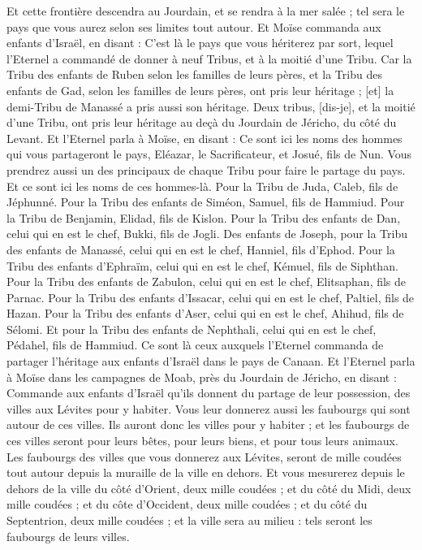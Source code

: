 \begin{multicols}{2}
Et cette frontière descendra au Jourdain, et se rendra à la mer salée ; tel sera le pays que vous aurez selon ses limites tout autour.
Et Moïse commanda aux enfants d'Israël, en disant : C'est là le pays que vous hériterez par sort, lequel l'Eternel a commandé de donner à neuf Tribus, et à la moitié d'une Tribu.
Car la Tribu des enfants de Ruben selon les familles de leurs pères, et la Tribu des enfants de Gad, selon les familles de leurs pères, ont pris leur héritage ; [et] la demi-Tribu de Manassé a pris aussi son héritage.
Deux tribus, [dis-je], et la moitié d'une Tribu, ont pris leur héritage au deçà du Jourdain de Jéricho, du côté du Levant.
Et l'Eternel parla à Moïse, en disant :
Ce sont ici les noms des hommes qui vous partageront le pays, Eléazar, le Sacrificateur, et Josué, fils de Nun.
Vous prendrez aussi un des principaux de chaque Tribu pour faire le partage du pays.
Et ce sont ici les noms de ces hommes-là. Pour la Tribu de Juda, Caleb, fils de Jéphunné.
Pour la Tribu des enfants de Siméon, Samuel, fils de Hammiud.
Pour la Tribu de Benjamin, Elidad, fils de Kislon.
Pour la Tribu des enfants de Dan, celui qui en est le chef, Bukki, fils de Jogli.
Des enfants de Joseph, pour la Tribu des enfants de Manassé, celui qui en est le chef, Hanniel, fils d'Ephod.
Pour la Tribu des enfants d'Ephraïm, celui qui en est le chef, Kémuel, fils de Siphthan.
Pour la Tribu des enfants de Zabulon, celui qui en est le chef, Elitsaphan, fils de Parnac.
Pour la Tribu des enfants d'Issacar, celui qui en est le chef, Paltiel, fils de Hazan.
Pour la Tribu des enfants d'Aser, celui qui en est le chef, Ahihud, fils de Sélomi.
Et pour la Tribu des enfants de Nephthali, celui qui en est le chef, Pédahel, fils de Hammiud.
Ce sont là ceux auxquels l'Eternel commanda de partager l'héritage aux enfants d'Israël dans le pays de Canaan.
\VerseOne{}Et l'Eternel parla à Moïse dans les campagnes de Moab, près du Jourdain de Jéricho, en disant :
Commande aux enfants d'Israël qu'ils donnent du partage de leur possession, des villes aux Lévites pour y habiter. Vous leur donnerez aussi les faubourgs qui sont autour de ces villes.
Ils auront donc les villes pour y habiter ; et les faubourgs de ces villes seront pour leurs bêtes, pour leurs biens, et pour tous leurs animaux.
Les faubourgs des villes que vous donnerez aux Lévites, seront de mille coudées tout autour depuis la muraille de la ville en dehors.
Et vous mesurerez depuis le dehors de la ville du côté d'Orient, deux mille coudées ; et du côté du Midi, deux mille coudées ; et du côte d'Occident, deux mille coudées ; et du côté du Septentrion, deux mille coudées ; et la ville sera au milieu : tels seront les faubourgs de leurs villes.

\end{multicols}
